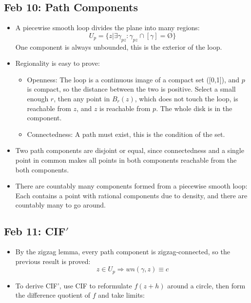 \documentclass[10pt, oneside]{article}
\let\foo\O
\renewcommand{\O}{\text{\foo}}
\begin{document}
\subsection{Feb 10: Path Components}
\begin{itemize}
    \item A piecewise smooth loop divides the plane into many regions:
        \[U_p = \{z | \exists \gamma_{pz} : \gamma_{pz} \cap [\gamma] = \O\}\]
        One component is always unbounded, this is the exterior of the loop.
    \item Regionality is easy to prove:
    \begin{itemize}
        \item Openness: The loop is a continuous image of a compact set ([0,1]), and $p$ is compact, so the distance between the two is positive. Select a small enough $r$, then any point in $B_r(z)$, which does not touch the loop, is reachable from $z$, and $z$ is reachable from $p$. The whole disk is in the component.
        \item Connectedness:
        A path must exist, this is the condition of the set.
    \end{itemize}
    \item Two path components are disjoint or equal, since connectedness and a single point in common makes all points in both components reachable from the both components.
    \item There are countably many components formed from a piecewise smooth loop: Each contains a point with rational components due to density, and there are countably many to go around.
\end{itemize}

\subsection{Feb 11: CIF$'$}
\begin{itemize}
    \item By the zigzag lemma, every path component is zigzag-connected, so the previous result is proved:
        \[z \in U_p \Rightarrow wn(\gamma,z) \equiv c\]
    \item To derive CIF', use CIF to reformulate $f(z+h)$ around a circle, then form the difference quotient of $f$ and take limits:
\end{itemize}
\end{document}
